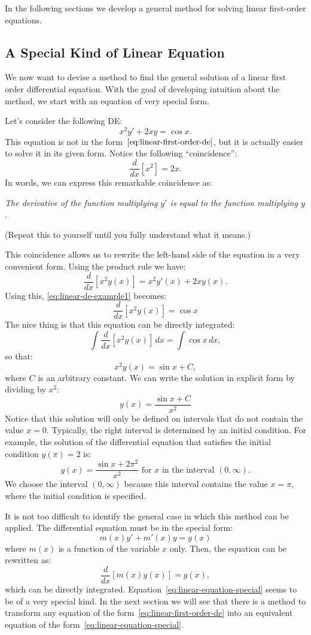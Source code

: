 \documentclass{ximera}
\begin{document}
In the following sections we develop a general method for solving linear first-order equations.
 
\subsection*{A Special Kind of Linear Equation}
We now want to devise a method to find the general solution of a linear first order differential equation. With the goal of developing intuition about the method, we start with an equation of very special form.
 
Let's consider the following DE:
\begin{equation}
\label{eq:linear-de-example1}
x^2y'+2xy=\cos x.
\end{equation}
This equation is not in the form~$\eqref{eq:linear-first-order-de}$, but it is actually easier to solve it in its given form. Notice the following ``coincidence'':
\[
\frac{d}{dx}[x^2]=2x.
\]
In words, we can express this remarkable coincidence as:
 
\begin{center}
\emph{The derivative of the function multiplying $y'$ is equal to the function multiplying $y$}.
\end{center}
 
(Repeat this to yourself until you fully understand what it means.)
 
This coincidence allows us to rewrite the left-hand side of the equation in a very convenient form. Using the product rule we have:
\[
\frac{d}{dx}\left[x^2y(x)\right]=x^2y'(x)+2xy(x).
\]
Using this, \ref{eq:linear-de-example1} becomes:
\[
\frac{d}{dx}\left[x^2y(x)\right]=\cos x
\]
The nice thing is that this equation can be directly integrated:
\[
\int \frac{d}{dx}\left[x^2y(x)\right]\, dx = \int \cos x\,dx,
\]
so that:
\[
x^2y(x)=\sin x + C,
\]
where $C$ is an arbitrary constant. We can write the solution in explicit form by dividing by $x^2$:
\[
y(x)=\frac{\sin x + C}{x^2}
\]
Notice that this solution will only be defined on intervals that do not contain the value $x=0$. Typically, the right interval is determined by an initial condition. For example, the solution of the differential equation that satisfies the initial condition $y(\pi)=2$ is:
\[
y(x)=\frac{\sin x + 2\pi^2}{x^2}\text{ for $x$ in the interval $(0,\infty)$}.
\]
We choose the interval $(0,\infty)$ because this interval contains the value $x=\pi$, where the initial condition is specified.
 
It is not too difficult to identify the general case in which this method can be applied. The differential equation must be in the special form:
\begin{equation}
\label{eq:linear-equation-special}
m(x)y'+m'(x)y=g(x)
\end{equation}
where $m(x)$ is a function of the variable $x$ only. Then, the equation can be rewritten as:
\[
\frac{d}{dx}\left[m(x)y(x)\right]=g(x),
\]
which can be directly integrated. Equation~\ref{eq:linear-equation-special} seems to be of a very special kind. In the next section we will see that there is a method to transform any equation of the form~\ref{eq:linear-first-order-de} into an equivalent equation of the form~\ref{eq:linear-equation-special}.
 
\end{document}
